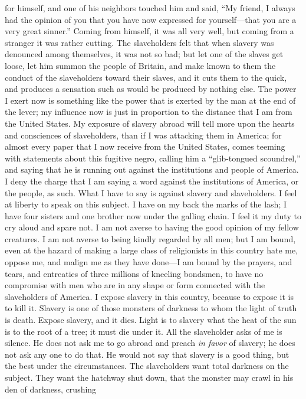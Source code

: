 for himself, and one of his neighbors touched him and said, ``My friend,
I always had the opinion of you that you have now expressed for
yourself---that you are a very great sinner.'' Coming from himself, it
was all very well, but coming from a stranger it was rather cutting. The
slaveholders felt that when slavery was denounced among themselves, it
was not so bad; but let one of the slaves get loose, let him summon the
people of Britain, and make known to them the conduct of the
slaveholders toward their slaves, and it cuts them to the quick, and
produces a sensation such as would be produced by nothing else. The
power I exert now is something like the power that is exerted by the man
at the end of the lever; my influence now is just in proportion to the
distance that I am from the United States. My exposure of slavery abroad
will tell more upon the hearts and consciences of slaveholders, than if
I was attacking them in America; for almost every paper that I now
receive from the United States, comes teeming with statements about this
fugitive negro, calling {}him a ``glib-tongued scoundrel,'' and saying
that he is running out against the institutions and people of America. I
deny the charge that I am saying a word against the institutions of
America, or the people, as such. What I have to say is against slavery
and slaveholders. I feel at liberty to speak on this subject. I have on
my back the marks of the lash; I have four sisters and one brother now
under the galling chain. I feel it my duty to cry aloud and spare not. I
am not averse to having the good opinion of my fellow creatures. I am
not averse to being kindly regarded by all men; but I am bound, even at
the hazard of making a large class of religionists in this country hate
me, oppose me, and malign me as they have done---I am bound by the
prayers, and tears, and entreaties of three millions of kneeling
bondsmen, to have no compromise with men who are in any shape or form
connected with the slaveholders of America. I expose slavery in this
country, because to expose it is to kill it. Slavery is one of those
monsters of darkness to whom the light of truth is death. Expose
slavery, and it dies. Light is to slavery what the heat of the sun is to
the root of a tree; it must die under it. All the slaveholder asks of me
is silence. He does not ask me to go abroad and preach \emph{in favor}
of slavery; he does not ask any one to do that. He would not say that
slavery is a good thing, but the best under the circumstances. The
slaveholders want total darkness on the subject. They want the hatchway
shut down, that the monster may crawl in his den of darkness, crushing
